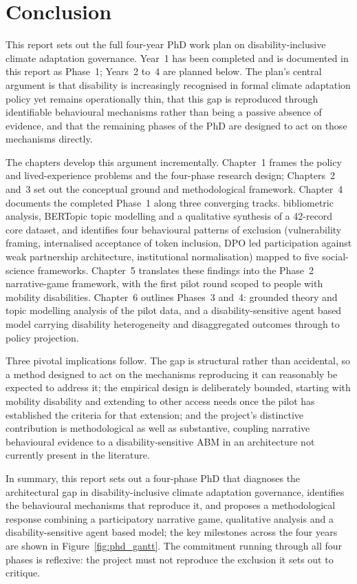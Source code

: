 \documentclass[12pt,a4paper]{report}
\begin{document}
\clearpage
\chapter{Conclusion}
\vspace*{-1cm}

This report sets out the full four-year PhD work plan on disability-inclusive climate adaptation governance. Year~1 has been completed and is documented in this report as Phase~1; Years~2 to~4 are planned below. The plan's central argument is that disability is increasingly recognised in formal climate adaptation policy yet remains operationally thin, that this gap is reproduced through identifiable behavioural mechanisms rather than being a passive absence of evidence, and that the remaining phases of the PhD are designed to act on those mechanisms directly.

The chapters develop this argument incrementally. Chapter~1 frames the policy and lived-experience problems and the four-phase research design; Chapters~2 and~3 set out the conceptual ground and methodological framework. Chapter~4 documents the completed Phase~1 along three converging tracks. bibliometric analysis, BERTopic topic modelling and a qualitative synthesis of a 42-record core dataset, and identifies four behavioural patterns of exclusion (vulnerability framing, internalised acceptance of token inclusion, DPO led participation against weak partnership architecture, institutional normalisation) mapped to five social-science frameworks. Chapter~5 translates these findings into the Phase~2 narrative-game framework, with the first pilot round scoped to people with mobility disabilities. Chapter~6 outlines Phases~3 and~4: grounded theory and topic modelling analysis of the pilot data, and a disability-sensitive agent based model carrying disability heterogeneity and disaggregated outcomes through to policy projection.

Three pivotal implications follow. The gap is structural rather than accidental, so a method designed to act on the mechanisms reproducing it can reasonably be expected to address it; the empirical design is deliberately bounded, starting with mobility disability and extending to other access needs once the pilot has established the criteria for that extension; and the project's distinctive contribution is methodological as well as substantive, coupling narrative behavioural evidence to a disability-sensitive ABM in an architecture not currently present in the literature.

In summary, this report sets out a four-phase PhD that diagnoses the architectural gap in disability-inclusive climate adaptation governance, identifies the behavioural mechanisms that reproduce it, and proposes a methodological response combining a participatory narrative game, qualitative analysis and a disability-sensitive agent based model; the key milestones across the four years are shown in Figure~\ref{fig:phd_gantt}. The commitment running through all four phases is reflexive: the project must not reproduce the exclusion it sets out to critique.
\end{document}
